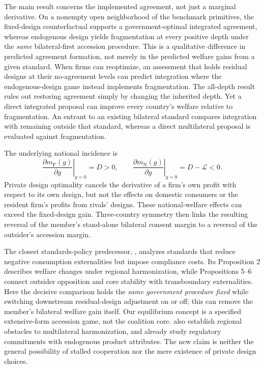 \documentclass[11pt,a4paper]{article}
\theoremstyle{remark}\newtheorem{remark}[theorem]{Remark}
\newcommand{\N}{\mathrm{N}}\newcommand{\F}{\mathrm{F}}
\newcommand{\loss}{\mathcal L}\newcommand{\vect}[1]{\boldsymbol{#1}}
\begin{document}
The main result concerns the implemented agreement, not just a marginal derivative. On a nonempty open neighborhood of the benchmark primitives, the fixed-design counterfactual supports a government-optimal integrated agreement, whereas endogenous design yields fragmentation at every positive depth under the \emph{same} bilateral-first accession procedure. This is a qualitative difference in predicted agreement formation, not merely in the predicted welfare gains from a given standard. When firms can reoptimize, an assessment that holds residual designs at their no-agreement levels can predict integration where the endogenous-design game instead implements fragmentation. The all-depth result rules out restoring agreement simply by changing the inherited depth. Yet a direct integrated proposal can improve every country's welfare relative to fragmentation. An entrant to an existing bilateral standard compares integration with remaining outside that standard, whereas a direct multilateral proposal is evaluated against fragmentation.

The underlying national incidence is
\begin{equation}\label{eq:introheadline}
\left.\frac{\partial m_{\F}(g)}{\partial g}\right|_{g=0}=D>0,\qquad
\left.\frac{\partial m_{\N}(g)}{\partial g}\right|_{g=0}=D-\loss<0.
\end{equation}
Private design optimality cancels the derivative of a firm's own profit with respect to its own design, but not the effects on domestic consumers or the resident firm's profits from rivals' designs. These national-welfare effects can exceed the fixed-design gain. Three-country symmetry then links the resulting reversal of the member's stand-alone bilateral consent margin to a reversal of the outsider's accession margin.

The closest standards-policy predecessor, \citet{Takarada2020}, analyzes standards that reduce negative consumption externalities but impose compliance costs. Its Proposition 2 describes welfare changes under regional harmonization, while Propositions 5--6 connect outsider opposition and core stability with transboundary externalities. Here the decisive comparison holds the \emph{same government procedure fixed} while switching downstream residual-design adjustment on or off; this can remove the member's bilateral welfare gain itself. Our equilibrium concept is a specified extensive-form accession game, not the coalition core. \citet{Kawabata2021} also establish regional obstacles to multilateral harmonization, and \citet{Grossman2021} already study regulatory commitments with endogenous product attributes. The new claim is neither the general possibility of stalled cooperation nor the mere existence of private design choices.
\end{document}
